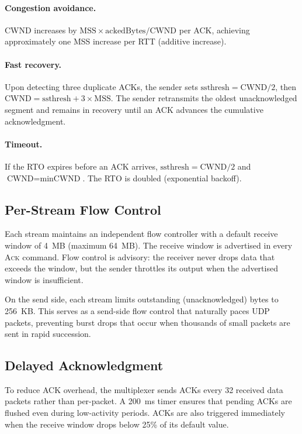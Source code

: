 \documentclass[11pt,a4paper]{article}
\let\oldparagraph\paragraph
\renewcommand{\paragraph}[1]{\needspace{5\baselineskip}\oldparagraph{#1}}
\begin{document}
\paragraph{Congestion avoidance.} CWND increases by $\text{MSS} \times \text{ackedBytes} / \text{CWND}$ per ACK, achieving approximately one MSS increase per RTT (additive increase).

\paragraph{Fast recovery.} Upon detecting three duplicate ACKs, the sender sets $\text{ssthresh} = \text{CWND}/2$, then $\text{CWND} = \text{ssthresh} + 3 \times \text{MSS}$. The sender retransmits the oldest unacknowledged segment and remains in recovery until an ACK advances the cumulative acknowledgment.

\paragraph{Timeout.} If the RTO expires before an ACK arrives, $\text{ssthresh} = \text{CWND}/2$ and $\text{CWND} = \text{minCWND}$. The RTO is doubled (exponential backoff).

\subsection{Per-Stream Flow Control}\label{sec:flow}

Each stream maintains an independent flow controller with a default receive window of 4~MB (maximum 64~MB). The receive window is advertised in every \textsc{Ack} command. Flow control is advisory: the receiver never drops data that exceeds the window, but the sender throttles its output when the advertised window is insufficient.

On the send side, each stream limits outstanding (unacknowledged) bytes to 256~KB. This serves as a send-side flow control that naturally paces UDP packets, preventing burst drops that occur when thousands of small packets are sent in rapid succession.

\subsection{Delayed Acknowledgment}\label{sec:delayed_ack}

To reduce ACK overhead, the multiplexer sends ACKs every 32 received data packets rather than per-packet. A 200~ms timer ensures that pending ACKs are flushed even during low-activity periods. ACKs are also triggered immediately when the receive window drops below 25\% of its default value.
\end{document}

